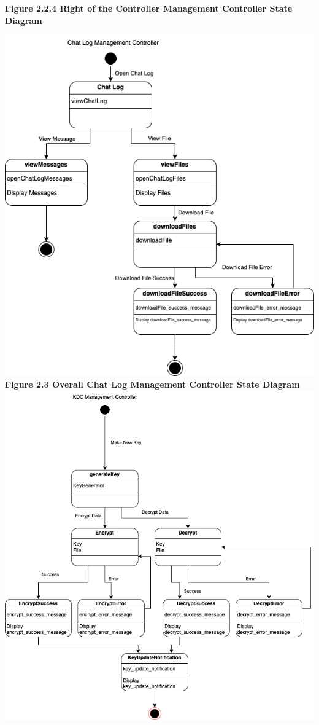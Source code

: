 \documentclass[]{article}
\begin{document}
\begin{center}
	\textbf{Figure 2.2.4 Right of the Controller Management Controller State Diagram}

	\includegraphics[width=\textwidth]{../images/ControllerStateDiagrams/ChatlogManagement.png}
	\textbf{Figure 2.3 Overall Chat Log Management Controller State Diagram}
	\includegraphics[width=\textwidth]{../images/ControllerStateDiagrams/KDCManagement.png}

\end{center}
\end{document}
